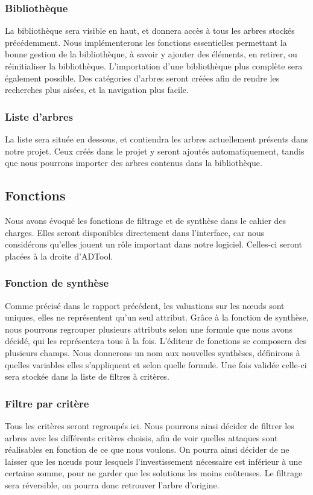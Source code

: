 		\subsubsection{Bibliothèque}
La bibliothèque sera visible en haut, et donnera accès à tous les arbres stockés précédemment. Nous implémenterons les fonctions essentielles permettant la bonne gestion de la bibliothèque, à savoir y ajouter des éléments, en retirer, ou réinitialiser la bibliothèque. L'importation d'une bibliothèque plus complète sera également possible.
Des catégories d'arbres seront créées afin de rendre les recherches plus aisées, et la navigation plus facile.

		\subsubsection{Liste d'arbres}
La liste sera située en dessous, et contiendra les arbres actuellement présents dans notre projet. Ceux créés dans le projet y seront ajoutés automatiquement, tandis que nous pourrons importer des arbres contenus dans la bibliothèque.

	\subsection{Fonctions}
Nous avons évoqué les fonctions de filtrage et de synthèse dans le cahier des charges. Elles seront disponibles directement dans l'interface, car nous considérons qu'elles jouent un rôle important dans notre logiciel. Celles-ci seront placées à la droite d'ADTool.

		\subsubsection{Fonction de synthèse}
Comme précisé dans le rapport précédent, les valuations sur les nœuds sont uniques, elles ne représentent qu'un seul attribut. Grâce à la fonction de synthèse, nous pourrons regrouper plusieurs attributs selon une formule que nous avons décidé, qui les représentera tous à la fois. L'éditeur de fonctions se composera des plusieurs champs. Nous donnerons un nom aux nouvelles synthèses, définirons à quelles variables elles s'appliquent et selon quelle formule. Une fois validée celle-ci sera stockée dans la liste de filtres à critères.

		\subsubsection{Filtre par critère}
Tous les critères seront regroupés ici. Nous pourrons ainsi décider de filtrer les arbres avec les différents critères choisis, afin de voir quelles attaques sont réalisables en fonction de ce que nous voulons. On pourra ainsi décider de ne laisser que les nœuds pour lesquels l'investissement nécessaire est inférieur à une certaine somme, pour ne garder que les solutions les moins coûteuses. Le filtrage sera réversible, on pourra donc retrouver l'arbre d'origine.
	
